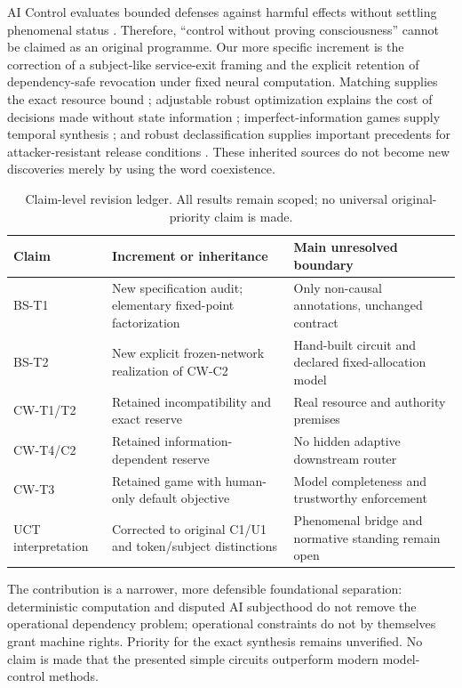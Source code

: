 AI Control evaluates bounded defenses against harmful effects without settling phenomenal status \cite{greenblatt}. Therefore, ``control without proving consciousness'' cannot be claimed as an original programme. Our more specific increment is the correction of a subject-like service-exit framing and the explicit retention of dependency-safe revocation under fixed neural computation. Matching supplies the exact resource bound \cite{hall}; adjustable robust optimization explains the cost of decisions made without state information \cite{bental}; imperfect-information games supply temporal synthesis \cite{chatterjee}; and robust declassification supplies important precedents for attacker-resistant release conditions \cite{myers}. These inherited sources do not become new discoveries merely by using the word coexistence.

\begin{table}[ht]
\centering\small
\caption{Claim-level revision ledger. All results remain scoped; no universal original-priority claim is made.}
\begin{tabularx}{\linewidth}{@{}lXX@{}}\toprule
Claim & Increment or inheritance & Main unresolved boundary\\\midrule
BS-T1 & New specification audit; elementary fixed-point factorization & Only non-causal annotations, unchanged contract\\
BS-T2 & New explicit frozen-network realization of CW-C2 & Hand-built circuit and declared fixed-allocation model\\
CW-T1/T2 & Retained incompatibility and exact reserve & Real resource and authority premises\\
CW-T4/C2 & Retained information-dependent reserve & No hidden adaptive downstream router\\
CW-T3 & Retained game with human-only default objective & Model completeness and trustworthy enforcement\\
UCT interpretation & Corrected to original C1/U1 and token/subject distinctions & Phenomenal bridge and normative standing remain open\\\bottomrule
\end{tabularx}
\end{table}
The contribution is a narrower, more defensible foundational separation: deterministic computation and disputed AI subjecthood do not remove the operational dependency problem; operational constraints do not by themselves grant machine rights. Priority for the exact synthesis remains unverified. No claim is made that the presented simple circuits outperform modern model-control methods.

